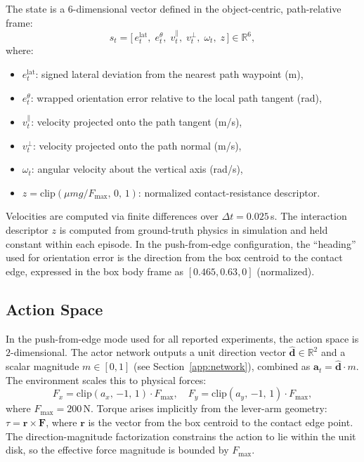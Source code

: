 The state is a $6$-dimensional vector defined in the object-centric, path-relative frame:
%
\begin{equation}
    s_t = \bigl[\, e^{\mathrm{lat}}_t,\; e^{\theta}_t,\; v^{\parallel}_t,\; v^{\perp}_t,\; \omega_t,\; z \,\bigr] \in \mathbb{R}^6,
\end{equation}
%
where:
\begin{itemize}
    \item $e^{\mathrm{lat}}_t$: signed lateral deviation from the nearest path waypoint (m),
    \item $e^{\theta}_t$: wrapped orientation error relative to the local path tangent (rad),
    \item $v^{\parallel}_t$: velocity projected onto the path tangent (m/s),
    \item $v^{\perp}_t$: velocity projected onto the path normal (m/s),
    \item $\omega_t$: angular velocity about the vertical axis (rad/s),
    \item $z = \mathrm{clip}(\mu m g / F_{\max},\, 0,\, 1)$: normalized contact-resistance descriptor.
\end{itemize}

Velocities are computed via finite differences over $\Delta t = 0.025$\,s.
The interaction descriptor $z$ is computed from ground-truth physics in simulation and held constant within each episode.
In the push-from-edge configuration, the ``heading'' used for orientation error is the direction from the box centroid to the contact edge, expressed in the box body frame as $[0.465, 0.63, 0]$ (normalized).

\subsection{Action Space}

In the push-from-edge mode used for all reported experiments, the action space is $2$-dimensional.
The actor network outputs a unit direction vector $\hat{\mathbf{d}} \in \mathbb{R}^2$ and a scalar magnitude $m \in [0,1]$ (see Section~\ref{app:network}), combined as $\mathbf{a}_t = \hat{\mathbf{d}} \cdot m$.
The environment scales this to physical forces:
%
\begin{equation}
    F_x = \mathrm{clip}(a_x,\, {-1},\, 1) \cdot F_{\max}, \quad F_y = \mathrm{clip}(a_y,\, {-1},\, 1) \cdot F_{\max},
\end{equation}
%
where $F_{\max} = 200$\,N.
Torque arises implicitly from the lever-arm geometry: $\tau = \mathbf{r} \times \mathbf{F}$, where $\mathbf{r}$ is the vector from the box centroid to the contact edge point.
The direction-magnitude factorization constrains the action to lie within the unit disk, so the effective force magnitude is bounded by $F_{\max}$.

